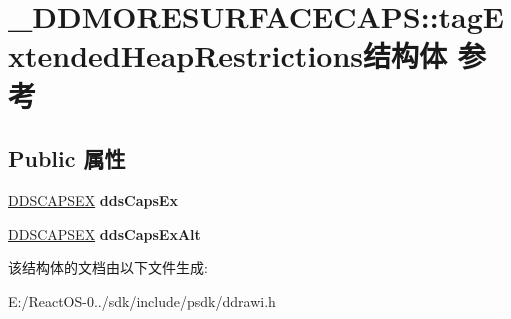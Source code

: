 \hypertarget{struct___d_d_m_o_r_e_s_u_r_f_a_c_e_c_a_p_s_1_1tag_extended_heap_restrictions}{}\section{\+\_\+\+D\+D\+M\+O\+R\+E\+S\+U\+R\+F\+A\+C\+E\+C\+A\+PS\+:\+:tag\+Extended\+Heap\+Restrictions结构体 参考}
\label{struct___d_d_m_o_r_e_s_u_r_f_a_c_e_c_a_p_s_1_1tag_extended_heap_restrictions}
\subsection*{Public 属性}
\begin{DoxyCompactItemize}
\item 
\mbox{\label{struct___d_d_m_o_r_e_s_u_r_f_a_c_e_c_a_p_s_1_1tag_extended_heap_restrictions_adfba30a7c3ba1762c890d98c1b44a0e6}} 
\hyperlink{struct___d_d_s_c_a_p_s_e_x}{D\+D\+S\+C\+A\+P\+S\+EX} {\bfseries dds\+Caps\+Ex}
\item 
\mbox{\label{struct___d_d_m_o_r_e_s_u_r_f_a_c_e_c_a_p_s_1_1tag_extended_heap_restrictions_a6ba2cda83a7c3f51ac0e6086503c063f}} 
\hyperlink{struct___d_d_s_c_a_p_s_e_x}{D\+D\+S\+C\+A\+P\+S\+EX} {\bfseries dds\+Caps\+Ex\+Alt}
\end{DoxyCompactItemize}


该结构体的文档由以下文件生成\+:\begin{DoxyCompactItemize}
\item 
E\+:/\+React\+O\+S-\/0../sdk/include/psdk/ddrawi.\+h\end{DoxyCompactItemize}
